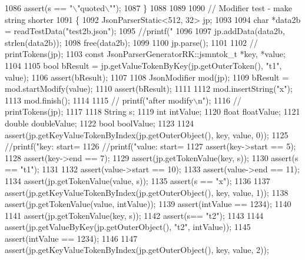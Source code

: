 \begin{DoxyCode}
{{{{{{{{{{{{1086         assert(s == \textcolor{stringliteral}{"\(\backslash\)"quoted\(\backslash\)""});
1087     \}
1088 
1089 
1090     \textcolor{comment}{// Modifier test - make string shorter}
1091     \{
1092         JsonParserStatic<512, 32> jp;
1093 
1094         \textcolor{keywordtype}{char} *data2b = readTestData(\textcolor{stringliteral}{"test2b.json"});
1095         \textcolor{comment}{//printf("%
1096 
1097         jp.addData(data2b, strlen(data2b));
1098         free(data2b);
1099 
1100         jp.parse();
1101 
1102         \textcolor{comment}{// printTokens(jp);}
1103         \textcolor{keyword}{const} JsonParserGeneratorRK::jsmntok_t *key, *value;
1104 
1105         \textcolor{keywordtype}{bool} bResult = jp.getValueTokenByKey(jp.getOuterToken(), \textcolor{stringliteral}{"t1"}, value);
1106         assert(bResult);
1107 
1108         JsonModifier mod(jp);
1109         bResult = mod.startModify(value);
1110         assert(bResult);
1111 
1112         mod.insertString(\textcolor{stringliteral}{"x"});
1113         mod.finish();
1114 
1115         \textcolor{comment}{// printf("after modify\(\backslash\)n");}
1116         \textcolor{comment}{// printTokens(jp);}
1117 
1118         String s;
1119         \textcolor{keywordtype}{int} intValue;
1120         \textcolor{keywordtype}{float} floatValue;
1121         \textcolor{keywordtype}{double} doubleValue;
1122         \textcolor{keywordtype}{bool} boolValue;
1123 
1124         assert(jp.getKeyValueTokenByIndex(jp.getOuterObject(), key, value, 0));
1125         \textcolor{comment}{//printf("key: start=%
1126         \textcolor{comment}{//printf("value: start=%
1127         assert(key->start == 5);
1128         assert(key->end == 7);
1129         assert(jp.getTokenValue(key, s));
1130         assert(s == \textcolor{stringliteral}{"t1"});
1131 
1132         assert(value->start == 10);
1133         assert(value->end == 11);
1134         assert(jp.getTokenValue(value, s));
1135         assert(s == \textcolor{stringliteral}{"x"});
1136 
1137         assert(jp.getKeyValueTokenByIndex(jp.getOuterObject(), key, value, 1));
1138         assert(jp.getTokenValue(value, intValue));
1139         assert(intValue == 1234);
1140 
1141         assert(jp.getTokenValue(key, s));
1142         assert(s== \textcolor{stringliteral}{"t2"});
1143 
1144         assert(jp.getValueByKey(jp.getOuterObject(), \textcolor{stringliteral}{"t2"}, intValue));
1145         assert(intValue == 1234);
1146 
1147         assert(jp.getKeyValueTokenByIndex(jp.getOuterObject(), key, value, 2));
}}}}}}}}}}}}}}}
\end{DoxyCode}
